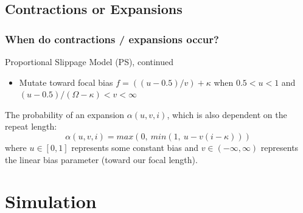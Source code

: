 \documentclass[11pt]{beamer}
\begin{document}
	\subsection{Contractions or Expansions}\label{subsec:contractionsOrExpansions}
	\begin{frame}
		\frametitle{When do contractions / expansions occur?}
		\begin{block}{Proportional Slippage Model (PS), continued}
			\begin{itemize}
				\item Mutate toward focal bias $f = ((u - 0.5) / v) + \kappa$ when $0.5 < u < 1$ and
				$(u - 0.5) / (\Omega - \kappa) < v < \infty$
			\end{itemize}
		\end{block}\bigskip

		The probability of an expansion $\alpha(u, v, i)$, which is also dependent on the repeat length:
		\begin{equation}
			\alpha(u, v, i) = \mathit{max}(0, \ \mathit{min}(1, \ u - v(i - \kappa)))
		\end{equation}
		where $u \in [0, 1]$ represents some constant bias and $v \in (-\infty, \infty)$ represents the linear bias
		parameter (toward our focal length).
	\end{frame}

	\section{Simulation}\label{sec:simulation}
\end{document}
